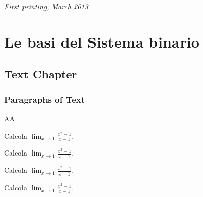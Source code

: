 \documentclass[11pt,fleqn]{book}
\begin{document}
\noindent \textit{First printing, March 2013}



\pagestyle{empty}

\tableofcontents

\pagestyle{fancy}

\newpage


\part{Le basi del Sistema binario}



\chapter{Text Chapter}

\section{Paragraphs of Text}
AA
\lipsum[1-7]

\setcounter{esercizio}{100}
\begin{esercizio}[4]
Calcola $\lim_{x \to 1} \frac{x^2 - 1}{x-1}$.

\lipsum[1]
\end{esercizio}
\begin{esercizio}[3]
Calcola $\lim_{x \to 1} \frac{x^2 - 1}{x-1}$.
\end{esercizio}
\begin{esercizio}[2]
Calcola $\lim_{x \to 1} \frac{x^2 - 1}{x-1}$.
\end{esercizio}
\begin{esercizio}[1]
Calcola $\lim_{x \to 1} \frac{x^2 - 1}{x-1}$.
\end{esercizio}
\end{document}
